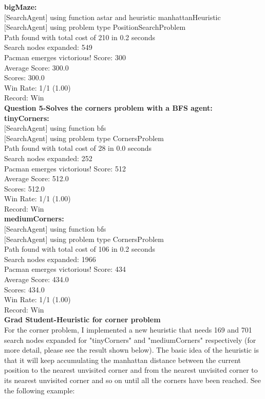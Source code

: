 \documentclass[11pt]{article}
\begin{document}
\noindent
\textbf{bigMaze:}\\
$[$SearchAgent$]$ using function astar and heuristic manhattanHeuristic\\
$[$SearchAgent$]$ using problem type PositionSearchProblem\\
Path found with total cost of 210 in 0.2 seconds\\
Search nodes expanded: 549\\
Pacman emerges victorious! Score: 300\\
Average Score: 300.0\\
Scores:        300.0\\
Win Rate:      1/1 (1.00)\\
Record:        Win\\

\newpage
\noindent
\textbf{Question 5-Solves the corners problem with a BFS agent:}\\
\textbf{tinyCorners:}\\
$[$SearchAgent$]$ using function bfs\\
$[$SearchAgent$]$ using problem type CornersProblem\\
Path found with total cost of 28 in 0.0 seconds\\
Search nodes expanded: 252\\
Pacman emerges victorious! Score: 512\\
Average Score: 512.0\\
Scores:        512.0\\
Win Rate:      1/1 (1.00)\\
Record:        Win\\

\noindent
\textbf{mediumCorners:}\\
$[$SearchAgent$]$ using function bfs\\
$[$SearchAgent$]$ using problem type CornersProblem\\
Path found with total cost of 106 in 0.2 seconds\\
Search nodes expanded: 1966\\
Pacman emerges victorious! Score: 434\\
Average Score: 434.0\\
Scores:        434.0\\
Win Rate:      1/1 (1.00)\\
Record:        Win\\

\newpage
\noindent
\textbf{Grad Student-Heuristic for corner problem}\\
For the corner problem, I implemented a new heuristic that needs 169 and 701 search nodes expanded for "tinyCorners" and "mediumCorners" respectively (for more detail, please see the result shown below). The basic idea of the heuristic is that it will keep accumulating the manhattan distance between the current position to the nearest unvisited corner and from the nearest unvisited corner to its nearest unvisited corner and so on until all the corners have been reached. See the following example:\\
\end{document}
